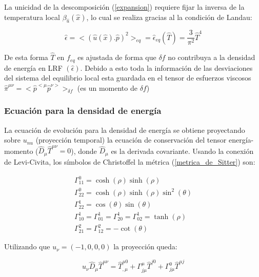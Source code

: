 \documentclass[11pt,a4paper]{article}
\begin{document}
La unicidad de la descomposición (\ref{expansion}) requiere fijar la inversa de la temperatura local $\beta_{\hat{u}}(\hat{x})$, lo cual se realiza gracias al la condición de Landau:

\begin{equation}
\hat{\epsilon}=<(\hat{u}(\hat{x}).\hat{p})^2>_{eq}=\hat{\epsilon}_{eq}({\hat{T}})=\frac{3}{\pi^2}{\hat{T}}^4
\end{equation}

De esta forma ${\hat{T}}$ en $f_{eq}$ es ajustada de forma que ${\delta}f$ no contribuya  a la densidad de energía en LRF $(\hat{\epsilon})$. Debido a esto toda la información de las desviaciones del sistema del equilibrio local esta guardada en el tensor de esfuerzos viscosos $\hat{\pi}^{{\mu}{\nu}}=<\hat{p}^{<\mu}\hat{p}^{\nu>}>_{{\delta}f}$ (es un momento de ${{\delta}f}$)


\subsubsection{Ecuación para la densidad de energía}
La ecuación de evolución para la densidad de energía se obtiene proyectando sobre $u_{nu}$ (proyección temporal) la ecuación de conservación del tensor energía-momento ($\hat{D}_{\mu}\hat{T}^{{\mu}{\nu}}=0$), donde $\hat{D}_{\mu}$ es la derivada covariante.
Usando la conexión de Levi-Civita, los símbolos de Christoffel la métrica (\ref{metrica_de_Sitter}) son:

\begin{subequations}
\begin{align}
\label{011}
\Gamma^{0}_{{1}{1}}=\cosh(\rho)\sinh(\rho)\\
\label{022}
\Gamma^{0}_{{2}{2}}=\cosh(\rho)\sinh(\rho)\sin^2(\theta)\\
\Gamma^{1}_{{2}{2}}=\cos(\theta)\sin(\theta)\\
\Gamma^{1}_{{1}{0}}=\Gamma^{1}_{{0}{1}}=\Gamma^{1}_{{2}{0}}=\Gamma^{1}_{{0}{2}}=\tanh(\rho)\\
\Gamma^{2}_{{2}{1}}=\Gamma^{2}_{{1}{2}}=-\cot(\theta)
\end{align}
\label{christoffel}
\end{subequations}

Utilizando que $u_{\nu}=(-1,0,0,0)$ la proyección queda:

\begin{equation}
u_{\nu}\hat{D}_{\mu}\hat{T}^{{\mu}{\nu}}= \hat{T}^{{\mu}{0}}_{,\mu} +\Gamma^{\mu}_{{j}{\mu}}\hat{T}^{{j}{0}}+\Gamma^{0}_{{j}{\mu}}\hat{T}^{{\mu}{j}}
\label{cons_proy}
\end{equation}
\end{document}
